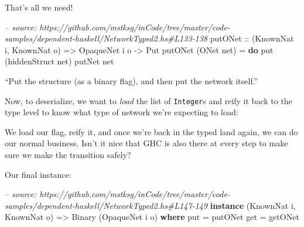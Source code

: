 \documentclass[]{article}
\newenvironment{Shaded}{}{}
\newcommand{\KeywordTok}[1]{\textcolor[rgb]{0.00,0.44,0.13}{\textbf{{#1}}}}
\newcommand{\DataTypeTok}[1]{\textcolor[rgb]{0.56,0.13,0.00}{{#1}}}
\newcommand{\CommentTok}[1]{\textcolor[rgb]{0.38,0.63,0.69}{\textit{{#1}}}}
\newcommand{\OtherTok}[1]{\textcolor[rgb]{0.00,0.44,0.13}{{#1}}}
\newcommand{\FunctionTok}[1]{\textcolor[rgb]{0.02,0.16,0.49}{{#1}}}
\newcommand{\NormalTok}[1]{{#1}}
\begin{document}
That's all we need!

\begin{Shaded}
\begin{Highlighting}[]
\CommentTok{-- source: https://github.com/mstksg/inCode/tree/master/code-samples/dependent-haskell/NetworkTyped2.hs#L133-138}
\OtherTok{putONet ::} \NormalTok{(}\DataTypeTok{KnownNat} \NormalTok{i, }\DataTypeTok{KnownNat} \NormalTok{o)}
        \OtherTok{=>} \DataTypeTok{OpaqueNet} \NormalTok{i o}
        \OtherTok{->} \DataTypeTok{Put}
\NormalTok{putONet (}\DataTypeTok{ONet} \NormalTok{net) }\FunctionTok{=} \KeywordTok{do}
    \NormalTok{put (hiddenStruct net)}
    \NormalTok{putNet net}
\end{Highlighting}
\end{Shaded}

``Put the structure (as a binary flag), and then put the network itself.''

Now, to deserialize, we want to \emph{load} the list of \texttt{Integer}s and
reify it back to the type level to know what type of network we're expecting to
load:

\begin{Shaded}
\end{Shaded}

We load our flag, reify it, and once we're back in the typed land again, we can
do our normal business. Isn't it nice that GHC is also there at every step to
make sure we make the transition safely?

Our final instance:

\begin{Shaded}
\begin{Highlighting}[]
\CommentTok{-- source: https://github.com/mstksg/inCode/tree/master/code-samples/dependent-haskell/NetworkTyped2.hs#L147-149}
\KeywordTok{instance} \NormalTok{(}\DataTypeTok{KnownNat} \NormalTok{i, }\DataTypeTok{KnownNat} \NormalTok{o) }\OtherTok{=>} \DataTypeTok{Binary} \NormalTok{(}\DataTypeTok{OpaqueNet} \NormalTok{i o) }\KeywordTok{where}
    \NormalTok{put }\FunctionTok{=} \NormalTok{putONet}
    \NormalTok{get }\FunctionTok{=} \NormalTok{getONet}
\end{Highlighting}
\end{Shaded}
\end{document}
